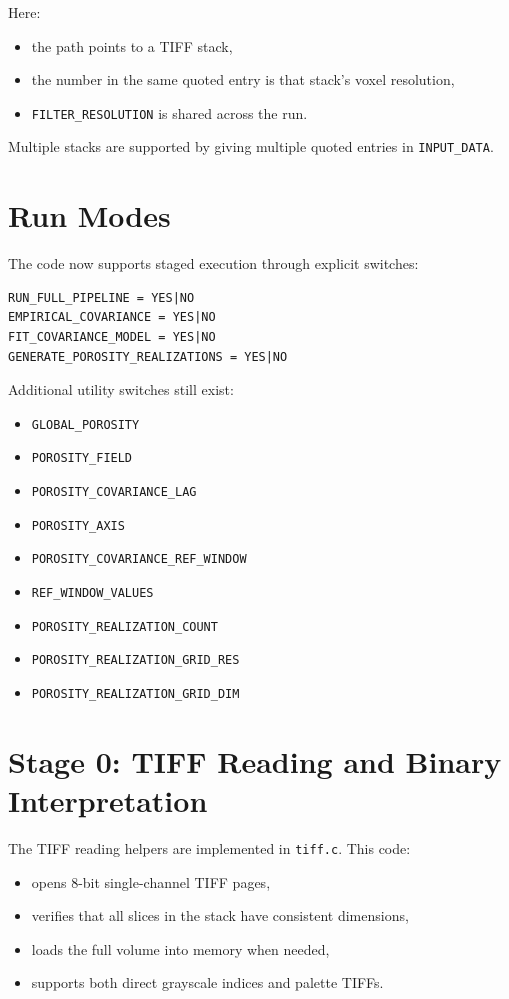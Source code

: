 \documentclass[11pt]{article}
\begin{document}
Here:
\begin{itemize}
\item the path points to a TIFF stack,
\item the number in the same quoted entry is that stack's voxel resolution,
\item \texttt{FILTER\_RESOLUTION} is shared across the run.
\end{itemize}

Multiple stacks are supported by giving multiple quoted entries in
\texttt{INPUT\_DATA}.

\section{Run Modes}
The code now supports staged execution through explicit switches:
\begin{verbatim}
RUN_FULL_PIPELINE = YES|NO
EMPIRICAL_COVARIANCE = YES|NO
FIT_COVARIANCE_MODEL = YES|NO
GENERATE_POROSITY_REALIZATIONS = YES|NO
\end{verbatim}

Additional utility switches still exist:
\begin{itemize}
\item \texttt{GLOBAL\_POROSITY}
\item \texttt{POROSITY\_FIELD}
\item \texttt{POROSITY\_COVARIANCE\_LAG}
\item \texttt{POROSITY\_AXIS}
\item \texttt{POROSITY\_COVARIANCE\_REF\_WINDOW}
\item \texttt{REF\_WINDOW\_VALUES}
\item \texttt{POROSITY\_REALIZATION\_COUNT}
\item \texttt{POROSITY\_REALIZATION\_GRID\_RES}
\item \texttt{POROSITY\_REALIZATION\_GRID\_DIM}
\end{itemize}

\section{Stage 0: TIFF Reading and Binary Interpretation}
The TIFF reading helpers are implemented in \texttt{tiff.c}. This code:
\begin{itemize}
\item opens 8-bit single-channel TIFF pages,
\item verifies that all slices in the stack have consistent dimensions,
\item loads the full volume into memory when needed,
\item supports both direct grayscale indices and palette TIFFs.
\end{itemize}
\end{document}
